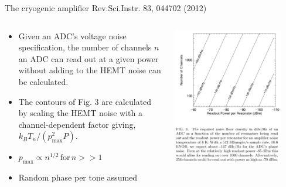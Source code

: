 \documentclass[ignorenonframetext,12pt]{beamer}
\begin{document}
\begin{frame}{The cryogenic amplifier}
				Rev.Sci.Instr. 83, 044702 (2012)
				\begin{columns}
								\begin{column}{0.45\textwidth}
												\begin{itemize}
																\item \footnotesize{Given an ADC's voltage noise
																				specification, the number of channels
																				{\color{blue}$n$} an ADC can read out at a given power
																				without adding to the HEMT noise can be
																				calculated.}
																\item The contours of Fig. 3 are calculated by
																				scaling the HEMT noise with a
																				channel-dependent factor giving, $k_B
																				T_n /(p_\text{max}^2 P)$.
																\item $p_\text{max} \propto
																				n^{1/2}\,\text{for}\,n >> 1$
																\item Random phase per tone assumed
												\end{itemize}
								\end{column}
								\begin{column}{0.45\textwidth}
								\includegraphics[width=0.85\textwidth]{power_vs_Nchannels}
								\end{column}
				\end{columns}
\end{frame}
\end{document}
